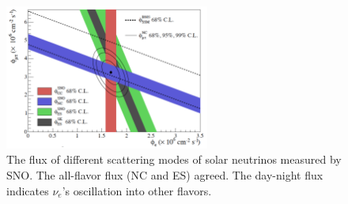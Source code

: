 \begin{figure}[h!]
\centering
\includegraphics[width=0.6\textwidth]{Figures/sno.png}
\caption[Solar neutrino oscillation]{The flux of different scattering modes of solar neutrinos measured by SNO. The all-flavor flux (NC and ES) agreed. The day-night flux indicates $\nu_e$'s oscillation into other flavors. }
\label{fig:sno}
\end{figure}

    
